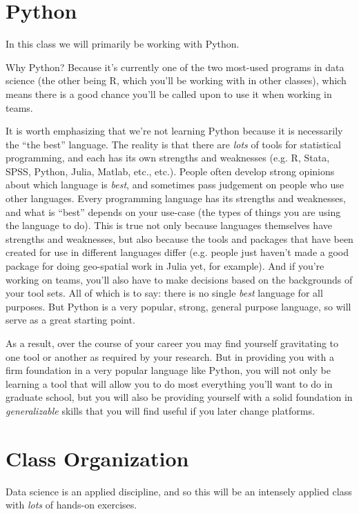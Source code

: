 \documentclass[12pt]{article}
\begin{document}
\section{Python}

In this class we will primarily be working with Python.

Why Python? Because it's currently one of the two most-used programs in data science (the other being R, which you'll be working with in other classes), which means there is a good chance you'll be called upon to use it when working in teams.

It is worth emphasizing that we're not learning Python because it is necessarily the ``the best'' language. The reality is that there are \emph{lots} of tools for statistical programming, and each has its own strengths and weaknesses (e.g. R, Stata, SPSS, Python, Julia, Matlab, etc., etc.). People often develop strong opinions about which language is \emph{best}, and sometimes pass judgement on people who use other languages. Every programming language has its strengths and weaknesses, and what is ``best'' depends on your use-case (the types of things you are using the language to do). This is true not only because languages themselves have strengths and weaknesses, but also because the tools and packages that have been created for use in different languages differ (e.g. people just haven't made a good package for doing geo-spatial work in Julia yet, for example). And if you're working on teams, you'll also have to make decisions based on the backgrounds of your tool sets. All of which is to say: there is no single \emph{best} language for all purposes. But Python is a very popular, strong, general purpose language, so will serve as a great starting point.

As a result, over the course of your career you may find yourself gravitating to one tool or another as required by your research. But in providing you with a firm foundation in a very popular language like Python, you will not only be learning a tool that will allow you to do most everything you'll want to do in graduate school, but you will also be providing yourself with a solid foundation in \emph{generalizable} skills that you will find useful if you later change platforms.

\section{Class Organization}

Data science is an applied discipline, and so this will be an intensely applied class with \emph{lots} of hands-on exercises.
\end{document}
